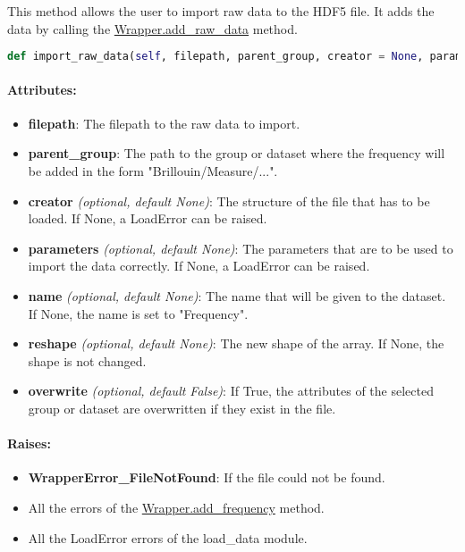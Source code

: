 This method allows the user to import raw data to the HDF5 file. It adds the data by calling the \hyperref[subchapter:wrapper.add_raw_data]{Wrapper.add\_raw\_data} method.


\begin{lstlisting}[language=Python]
def import_raw_data(self, filepath, parent_group, creator = None, parameters = None, name = None, reshape = None, overwrite = False):
\end{lstlisting}

\paragraph{Attributes:}

\begin{itemize}
    \item \textbf{filepath}: The filepath to the raw data to import.
    \item \textbf{parent\_group}: The path to the group or dataset where the frequency will be added in the form "Brillouin/Measure/...".
    \item \textbf{creator} \textit{(optional, default None)}: The structure of the file that has to be loaded. If None, a LoadError can be raised.
    \item \textbf{parameters} \textit{(optional, default None)}: The parameters that are to be used to import the data correctly.  If None, a LoadError can be raised.
    \item \textbf{name} \textit{(optional, default None)}: The name that will be given to the dataset. If None, the name is set to "Frequency".
    \item \textbf{reshape} \textit{(optional, default None)}: The new shape of the array. If None, the shape is not changed.
    \item \textbf{overwrite} \textit{(optional, default False)}: If True, the attributes of the selected group or dataset are overwritten if they exist in the file.
\end{itemize}

\paragraph{Raises:}
\begin{itemize}
    \item \textbf{WrapperError\_FileNotFound}: If the file could not be found.
    \item All the errors of the \hyperref[subchapter:wrapper.add_frequency]{Wrapper.add\_frequency} method.
    \item All the LoadError errors of the load\_data module.
\end{itemize}
